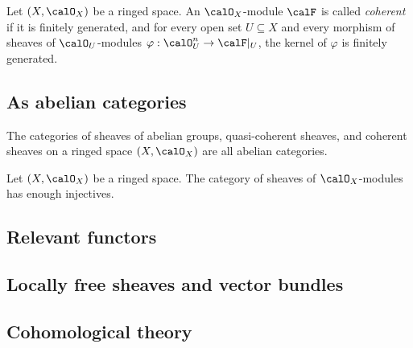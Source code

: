     \begin{definition}\label{def:coherent_sheaf}
        Let \((X,\calO_X)\) be a ringed space.
        An \(\calO_X\)-module \(\calF\) is called \emph{coherent} if it is finitely generated, and for every open set \(U\subseteq X\) and every morphism of sheaves of \(\calO_U\)-modules \(\varphi:\calO_U^n \to \calF|_U\), the kernel of \(\varphi\) is finitely generated.
    \end{definition}

\subsection{As abelian categories}

    \begin{theorem}\label{thm:sheaves_of_ab_mod_qcoh_coh_are_abelian_categories}
        The categories of sheaves of abelian groups, quasi-coherent sheaves, and coherent sheaves on a ringed space \((X,\calO_X)\) are all abelian categories.
    \end{theorem}

    \begin{theorem}\label{thm:O_X_mod_has_enough_injectives}
        Let \((X,\calO_X)\) be a ringed space.
        The category of sheaves of \(\calO_X\)-modules has enough injectives.
    \end{theorem}

    

\subsection{Relevant functors}

    

\subsection{Locally free sheaves and vector bundles}

    

\subsection{Cohomological theory}

    